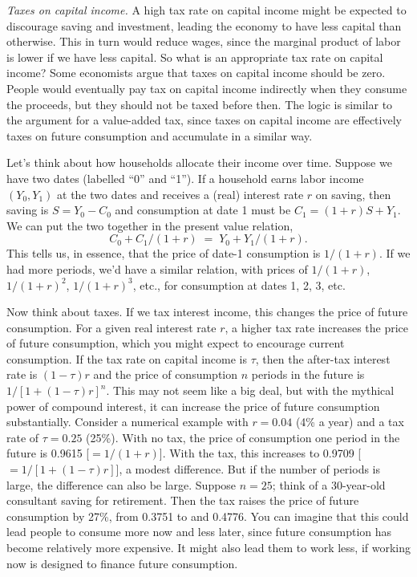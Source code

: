 \documentclass[letterpaper,12pt]{article}
\begin{document}
{\it Taxes on capital income.\/}
A high tax rate on capital income might be expected
to discourage saving and investment,
leading the economy to have less capital than otherwise.
This in turn would reduce wages, since
the marginal product of labor is lower if we have less capital.
So what is an appropriate tax rate on capital income?
Some economists argue that taxes on capital income should be zero.
People would eventually pay tax on capital income indirectly
when they consume the proceeds,
but they should not be taxed before then.
The logic is similar to the argument for a value-added tax,
since taxes on capital income are effectively taxes on future
consumption and accumulate in a similar way.


Let's think about how households allocate their income over time.
Suppose we have two dates (labelled ``0'' and ``1'').
If a household earns labor income $(Y_0,Y_1)$ at the two dates
and receives
a (real) interest rate $r$ on saving,
then saving is $ S = Y_0 - C_0$ and
consumption at date 1 must be
$ C_1 = (1+r) S + Y_1 $.
We can put the two together in the present value relation,
\[
    C_0 + C_1/(1+r) \;=\;  Y_0 + Y_1/(1+r) .
\]
This tells us, in essence, that the price of date-1 consumption
is $1/(1+r)$.
If we had more periods, we'd have a similar relation,
with prices of $1/(1+r)$, $1/(1+r)^2$, $1/(1+r)^3$, etc.,
for consumption at dates 1, 2, 3, etc.


Now think about taxes.  If we tax interest income, this changes
the price of future consumption.
For a given real interest rate $r$,
a higher tax rate increases the price of future consumption,
which you might expect to encourage current consumption.
If the tax rate on capital income is $\tau$,
then the after-tax interest rate is $ (1-\tau) r$
and the price of consumption $n$ periods in the future
is $ 1/[1+(1-\tau)r]^n $.
This may not seem like a big deal,
but with the mythical power of compound interest,
it can increase the price of future consumption substantially.
Consider a numerical example with $r = 0.04$ (4\% a year)
and a tax rate of $\tau = 0.25$ (25\%).
With no tax, the price of consumption one period in the future
is 0.9615 [$=1/(1+r)$].
With the tax, this increases to 0.9709 [$=1/[1+(1-\tau)r]$],
a modest difference.
But if the number of periods is large, the difference can also be large.
Suppose $n=25$; think of a 30-year-old consultant saving for
retirement.
Then the tax raises the price of future consumption by 27\%,
from 0.3751 to and 0.4776.
You can imagine that this could lead people to consume more now
and less later, since future consumption has become relatively
more expensive.
It might also lead them to work less, if working now is
designed to finance future consumption.
\end{document}
